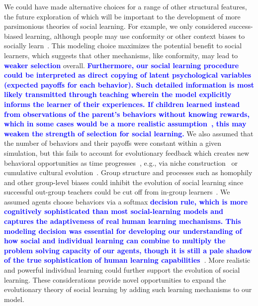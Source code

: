 \documentclass[letterpaper,11.5pt]{scrartcl}
\newcommand{\edit}[1]{{\bfseries \textcolor{blue} {#1}}}
\begin{document}
We could have made alternative choices for a range of other structural features, the future exploration of which
will be important to the development of more parsimonious theories of social learning.  
For example, we only considered success-biased learning, although people may use conformity or other context biases to socially learn~\citep{BoydRicherson1985,Muthukrishna2016a,Smaldino2018b}. This modeling
choice maximizes the potential benefit to social learners, which suggests that
other mechanisms, like conformity, may lead to \edit{weaker selection} overall. 
\edit{Furthermore, our social learning procedure could be interpreted as direct copying of latent psychological variables (expected payoffs for each behavior). Such detailed information is most likely transmitted through teaching wherein the model explicitly informs the learner of their experiences. If children learned instead from observations of the parent's behaviors without knowing rewards, which in some cases would be a more realistic assumption~\citep{Wu2022b}, this may weaken the strength of selection for social learning.} We also assumed that the number of behaviors and their payoffs were constant within a
given simulation, but this fails to account for evolutionary feedback which creates
new behavioral opportunities as time progresses\edit{~\citep{Chimento2022}}, e.g., via niche
construction~\citep{Smaldino2012a,Heras-Escribano2020} or cumulative cultural
evolution~\citep{Smolla2019,Derex2020}.  Group structure and processes such as
homophily and other group-level biases could inhibit the evolution of social
learning since successful out-group teachers could be cut off from in-group
learners~\citep{Golub2012}. We assumed agents choose behaviors via a softmax
\edit{decision rule, which is more cognitively sophisticated than most
social-learning models and captures the adaptiveness of real human learning
mechanisms. This modeling decision was essential for developing our understanding of
how social and individual learning can combine to multiply the problem solving capacity
of our agents, though it is still a pale shadow of the true sophistication of human
learning capabilities~\citep{Schulz2020a,Wu2022}}. More realistic and powerful individual learning could further support the evolution of
social learning. These considerations provide novel opportunities to expand the evolutionary theory of social learning by adding
such learning mechanisms to our model.

\end{document}
